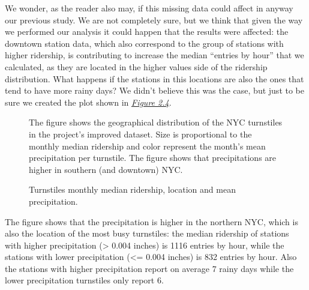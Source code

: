\documentclass[letterpaper,10pt,english]{sphinxmanual}
\begin{document}
We wonder, as the reader also may, if this missing data could affect in anyway
our previous study. We are not completely sure, but we think that given the way
we performed our analysis it could happen that the results were affected: the downtown
station data, which also correspond to the group of stations with higher ridership,
is contributing to increase the median ``entries by hour'' that we calculated, as they are
located in the higher values side of the ridership distribution. What happens if
the stations in this locations are also the ones that tend to have more rainy days?
We didn't believe this was the case, but just to be sure we created the
plot shown in {\hyperref[section1:figure24]{\emph{Figure 2.4}}}.
\begin{figure}[htbp]
\centering
\capstart

\caption{Turnstiles monthly median ridership, location and mean precipitation.}{\small 
The figure shows the geographical distribution of the NYC turnstiles in the
project's improved dataset. Size is proportional to the monthly median ridership
and color represent the month's mean precipitation per turnstile. The figure
shows that precipitations are higher in southern (and downtown) NYC.
}\label{section1:figure24}\end{figure}

The figure shows that the precipitation is higher in the northern NYC, which is
also the location of the most busy turnstiles: the median ridership of stations with
higher precipitation (\textgreater{} 0.004 inches) is 1116 entries by hour, while the stations
with lower precipitation (\textless{}= 0.004 inches) is 832 entries by hour. Also the stations
with higher precipitation report on average 7 rainy days while the lower precipitation
turnstiles only report 6.
\end{document}
